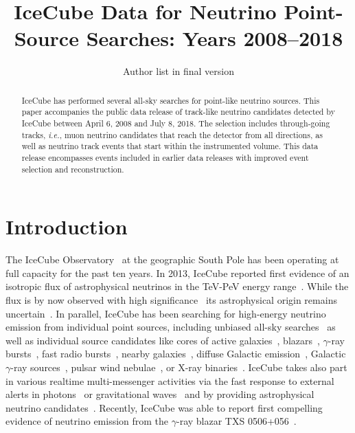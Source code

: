\documentclass[aps,10pt,prd,twocolumn,floats,letterpaper,showpacs,nofootinbib,bibnotes,notitlepage,superscriptaddress,floatfix]{revtex4-1}
\begin{document}
\title{IceCube Data for Neutrino Point-Source Searches: Years 2008--2018}

\author{Author list in final version}
%
\noaffiliation

\pacs{}

\begin{abstract}
IceCube has performed several all-sky searches for point-like neutrino sources. This paper accompanies the public data release of track-like neutrino candidates detected by IceCube between April 6, 2008 and July 8, 2018. The selection includes through-going tracks, {\it i.e.}, muon neutrino candidates that reach the detector from all directions, as well as neutrino track events that start within the instrumented volume. This data release encompasses events included in earlier data releases with improved event selection and reconstruction.
\end{abstract}

\maketitle

\section{Introduction}

The IceCube Observatory~\cite{Aartsen:2016nxy} at the geographic South Pole has been operating at full capacity for the past ten years. In 2013, IceCube reported first evidence of an isotropic flux of astrophysical neutrinos in the TeV-PeV energy range~\cite{Aartsen:2013bka,Aartsen:2013jdh}. While the flux is by now observed with high significance~\cite{Aartsen:2014gkd,Aartsen:2015rwa,Aartsen:2016xlq,IceCube:2018dnn,IceCube:2018cha} its astrophysical origin remains uncertain~\cite{Ahlers:2018fkn}. In parallel, IceCube has been searching for high-energy neutrino emission from individual point sources, including unbiased all-sky searches~\cite{Abbasi:2010rd,Aartsen:2013uuv,Aartsen:2014cva,Aartsen:2014cva,Aartsen:2018ywr,Aartsen:2019fau} as well as individual source candidates like cores of active galaxies~\cite{Bradascio:2019xdd}, blazars~\cite{Aartsen:2016lir}, $\gamma$-ray bursts~\cite{Abbasi:2012zw,Aartsen:2014aqy,Aartsen:2016qcr,Aartsen:2017wea}, fast radio bursts~\cite{Aartsen:2017zvw}, nearby galaxies~\cite{Aartsen:2019xkn}, diffuse Galactic emission~\cite{Albert:2018vxw}, Galactic $\gamma$-ray sources~\cite{Kheirandish:2019bke}, pulsar wind nebulae~\cite{Aartsen:2020eof}, or X-ray binaries~\cite{Abbasi:2011ke}. IceCube takes also part in various realtime multi-messenger activities via the fast response to external alerts in photons~\cite{Abbasi:2011ja,Aartsen:2015trq} or gravitational waves~\cite{Adrian-Martinez:2016xgn,ANTARES:2017iky,Aartsen:2020mla} and by providing astrophysical neutrino candidates~\cite{Aartsen:2016lmt,AyalaSolares:2020ing}. Recently, IceCube was able to report first compelling evidence of neutrino emission from the $\gamma$-ray blazar TXS 0506+056~\cite{Finley:2019vpk,IceCube:2018cha}.
\end{document}
